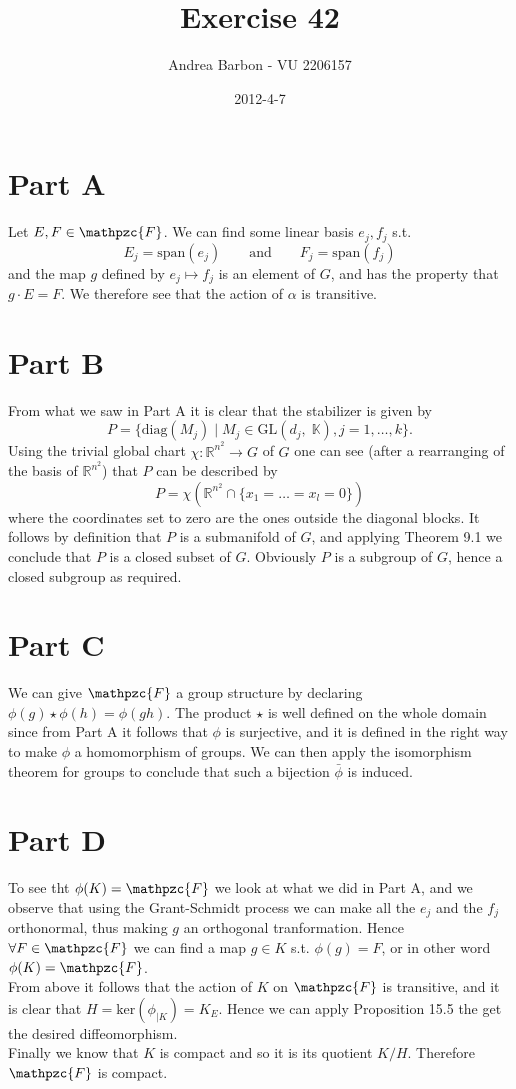 \documentclass[]{article}
\title{Exercise 42}
\author{ Andrea Barbon - VU 2206157 }
\date{2012-4-7}
\newcommand{\AND}{\qquad \text{and} \qquad}
\newcommand{\F}{\mathpzc{F}}
\begin{document}
\ifpdf
{}
\else
{}
\fi

\maketitle

\section{Part A}
Let $E,F \in \mathpzc{F} $. We can find some linear basis $e_j,f_j$ s.t. 
$$ E_j = \text{span}(e_j) \AND F_j = \text{span}(f_j) $$
and the map $ g $ defined by $e_j \mapsto f_j$ is an element of $G$, and has the property that $ g\cdot E=F $. We therefore see that the action of $\alpha$ is transitive.

\section{Part B}
From what we saw in Part A it is clear that the stabilizer is given by $$ P=\{ \text{diag}(M_j) \mid M_j \in \text{GL}(d_j,\;\mathbb{K}), j=1,\dots,k \}. $$
Using the trivial global chart $\chi:\mathbb{R}^{n^2}\to G$ of $G$ one can see (after a rearranging of the basis of $\mathbb{R}^{n^2}$) that $P$ can be described by $$ P=\chi(\mathbb{R}^{n^2} \cap \{x_1=\dots=x_l=0\}) $$ where the coordinates set to zero are the ones outside the diagonal blocks. It follows by definition that $P$ is a submanifold of $G$, and applying Theorem 9.1 we conclude that $P$ is a closed subset of $G$. Obviously $P$ is a subgroup of $G$, hence a closed subgroup as required.


\section{Part C}
We can give $\mathpzc{F}$ a group structure by declaring $ \phi(g) \star \phi(h) = \phi(gh) $. The product $\star$ is well defined on the whole domain since from Part A it follows that $\phi$ is surjective, and it is defined in the right way to make $\phi$ a homomorphism of groups. We can then apply the isomorphism theorem for groups to conclude that such a bijection $\bar{\phi}$ is induced. 


\section{Part D}
To see tht $\phi(K)=\mathpzc{F}$ we look at what we did in Part A, and we observe that using the Grant-Schmidt process we can make all the $e_j$ and the $f_j$ orthonormal, thus making $g$ an orthogonal tranformation. Hence $\forall F \in \mathpzc{F}$ we can find a map $g\in K$ s.t. $\phi(g)=F$, or in other word $\phi(K)=\mathpzc{F}$. \\
From above it follows that the action of $K$ on $\mathpzc{F}$ is transitive, and it is clear that $ H = \text{ker}(\phi_{|K}) = K_E $. Hence we can apply Proposition 15.5 the get the desired diffeomorphism.\\
Finally we know that $K$ is compact and so it is its quotient $K/H$. Therefore $\F$ is compact.
\end{document}
